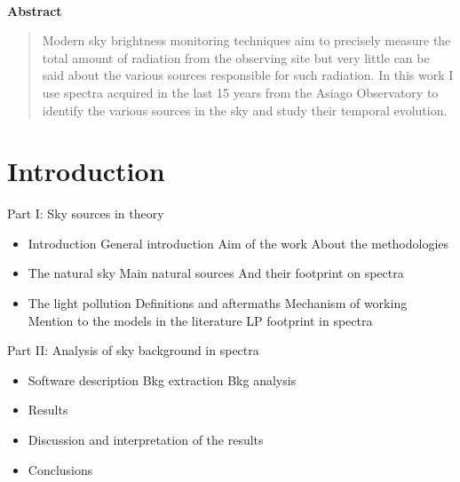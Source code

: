 \documentclass[a4paper, titlepage, 10pt]{book}
\newenvironment{abstract}{%
	\newpage\thispagestyle{empty}\vspace*{3\baselineskip}
	\begin{center}\Large\textbf{Abstract}\end{center}%
	\begin{quotation}%
	}{\end{quotation}\clearpage}
\begin{document}
\begin{frontespizio}
	\Preambolo{\renewcommand{\frontsmallfont}[1]{\small Badge number }}
	\Rientro{2cm}
\end{frontespizio}

\thispagestyle{empty}
\
\begin{abstract}
	Modern sky brightness monitoring techniques aim to precisely measure the total amount of radiation from the observing site but very little can be said about the various sources responsible for such radiation.
	In this work I use spectra acquired in the last 15 years from the Asiago Observatory to identify the various sources in the sky and study their temporal evolution.
\end{abstract}

\clearpage

\tableofcontents

\chapter{Introduction}
Part I: Sky sources in theory
\begin{itemize}
	\item Introduction
		\subitem General introduction
		\subitem Aim of the work
		\subitem About the methodologies
	\item The natural sky
		\subitem Main natural sources
		\subitem And their footprint on spectra
	\item The light pollution
		\subitem Definitions and aftermaths
		\subitem Mechanism of working
		\subitem Mention to the models in the literature
		\subitem LP footprint in spectra
\end{itemize}
Part II: Analysis of sky background in spectra
\begin{itemize}
	\item Software description
		\subitem Bkg extraction
		\subitem Bkg analysis
	\item Results
	\item Discussion and interpretation of the results
	\item Conclusions
\end{itemize}
\end{document}
